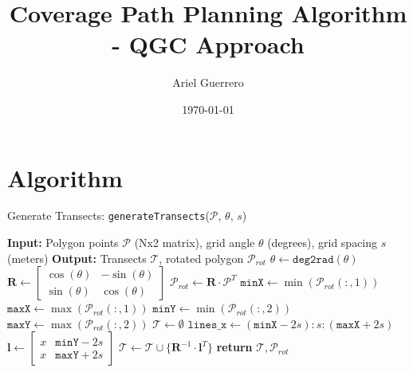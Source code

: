 \documentclass{article}
\begin{document}
\title{Coverage Path Planning Algorithm -  QGC Approach}
\author{Ariel Guerrero}
\date{\today}
\maketitle

\section*{Algorithm}
\begin{algorithm}
\caption{Generate Transects: \texttt{generateTransects}($\mathcal{P}$, $\theta$, $s$)}
\begin{algorithmic}[1]
\State \textbf{Input:} Polygon points $\mathcal{P}$ (Nx2 matrix), grid angle $\theta$ (degrees), grid spacing $s$ (meters)
\State \textbf{Output:} Transects $\mathcal{T}$, rotated polygon $\mathcal{P}_{rot}$
\State
\State $\theta \gets \texttt{deg2rad}(\theta)$
\State $\mathbf{R} \gets \begin{bmatrix} \cos(\theta) & -\sin(\theta) \\ \sin(\theta) & \cos(\theta) \end{bmatrix}$
\State $\mathcal{P}_{rot} \gets \mathbf{R} \cdot \mathcal{P}^T$
\State
\State $\texttt{minX} \gets \min(\mathcal{P}_{rot}(:,1))$
\State $\texttt{maxX} \gets \max(\mathcal{P}_{rot}(:,1))$
\State $\texttt{minY} \gets \min(\mathcal{P}_{rot}(:,2))$
\State $\texttt{maxY} \gets \max(\mathcal{P}_{rot}(:,2))$
\State
\State $\mathcal{T} \gets \emptyset$
\State $\texttt{lines\_x} \gets (\texttt{minX} - 2s):s:(\texttt{maxX} + 2s)$
    \State $\mathbf{l} \gets \begin{bmatrix} x & \texttt{minY} - 2s \\ x & \texttt{maxY} + 2s \end{bmatrix}$
    \State $\mathcal{T} \gets \mathcal{T} \cup \{\mathbf{R}^{-1} \cdot \mathbf{l}^T\}$
\EndFor
\State
\State \textbf{return} $\mathcal{T}, \mathcal{P}_{rot}$
\end{algorithmic}
\end{algorithm}
\end{document}
